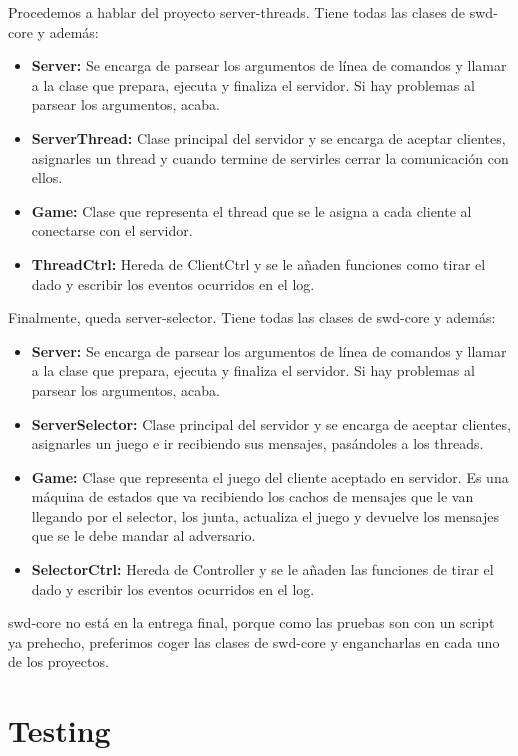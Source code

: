 Procedemos a hablar del proyecto server-threads. Tiene todas las clases de swd-core y además:
\begin{itemize}
\item \textbf{Server:} Se encarga de parsear los argumentos de línea de comandos y llamar a la clase que prepara, ejecuta y finaliza el servidor. Si hay problemas al parsear los argumentos, acaba.
\item \textbf{ServerThread:} Clase principal del servidor y se encarga de aceptar clientes, asignarles un thread y cuando termine de servirles cerrar la comunicación con ellos.
\item \textbf{Game:} Clase que representa el thread que se le asigna a cada cliente al conectarse con el servidor.
\item \textbf{ThreadCtrl:} Hereda de ClientCtrl y se le añaden funciones como tirar el dado y escribir los eventos ocurridos en el log.
\end{itemize}

Finalmente, queda server-selector. Tiene todas las clases de swd-core y además:
\begin{itemize}
\item \textbf{Server:} Se encarga de parsear los argumentos de línea de comandos y llamar a la clase que prepara, ejecuta y finaliza el servidor. Si hay problemas al parsear los argumentos, acaba.
\item \textbf{ServerSelector:} Clase principal del servidor y se encarga de aceptar clientes, asignarles un juego e ir recibiendo sus mensajes, pasándoles a los threads.
\item \textbf{Game:} Clase que representa el juego del cliente aceptado en servidor. Es una máquina de estados que va recibiendo los cachos de mensajes que le van llegando por el selector, los junta, actualiza el juego y devuelve los mensajes que se le debe mandar al adversario.
\item \textbf{SelectorCtrl:} Hereda de Controller y se le añaden las funciones de tirar el dado y escribir los eventos ocurridos en el log.
\end{itemize}

swd-core no está en la entrega final, porque como las pruebas son con un script ya prehecho, preferimos coger las clases de swd-core y engancharlas en cada uno de los proyectos.

\newpage
\section*{Testing}
